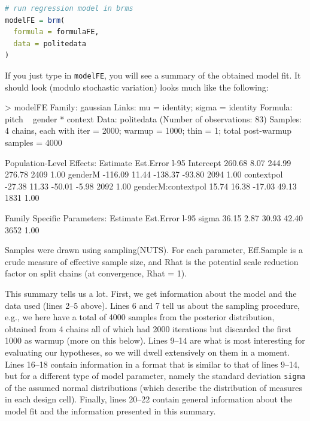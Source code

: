 \documentclass[nobib]{tufte-handout}
\begin{document}
\begin{minipage}[]{\textwidth}
\begin{lstlisting}[language=R]
# run regression model in brms
modelFE = brm(
  formula = formulaFE,
  data = politedata
)
\end{lstlisting}
\end{minipage}

If you just type in \texttt{modelFE}, you will see a summary of the obtained model fit. It should look (modulo stochastic variation) looks much like the following:

\medskip

\begin{minipage}[]{1.2\textwidth}
\begin{rc}
> modelFE
 Family: gaussian 
  Links: mu = identity; sigma = identity 
Formula: pitch ~ gender * context 
   Data: politedata (Number of observations: 83) 
Samples: 4 chains, each with iter = 2000; warmup = 1000; thin = 1;
         total post-warmup samples = 4000

Population-Level Effects: 
                   Estimate Est.Error l-95%
Intercept            260.68      8.07   244.99   276.78       2409 1.00
genderM             -116.09     11.44  -138.37   -93.80       2094 1.00
contextpol           -27.38     11.33   -50.01    -5.98       2092 1.00
genderM:contextpol    15.74     16.38   -17.03    49.13       1831 1.00

Family Specific Parameters: 
      Estimate Est.Error l-95%
sigma    36.15      2.87    30.93    42.40       3652 1.00

Samples were drawn using sampling(NUTS). For each parameter, Eff.Sample 
is a crude measure of effective sample size, and Rhat is the potential 
scale reduction factor on split chains (at convergence, Rhat = 1).
\end{rc}
\end{minipage}

\medskip

This summary tells us a lot. First, we get information about the model and the data used (lines 2--5 above). Lines 6 and 7 tell us about the sampling procedure, e.g., we here have a total of 4000 samples from the posterior distribution, obtained from 4 chains all of which had 2000 iterations but discarded the first 1000 as warmup (more on this below). Lines 9--14 are what is most interesting for evaluating our hypotheses, so we will dwell extensively on them in a moment. Lines 16--18 contain information in a format that is similar to that of lines 9--14, but for a different type of model parameter, namely the standard deviation \texttt{sigma} of the assumed normal distributions (which describe the distribution of measures in each design cell). Finally, lines 20--22 contain general information about the model fit and the information presented in this summary.
\end{document}
